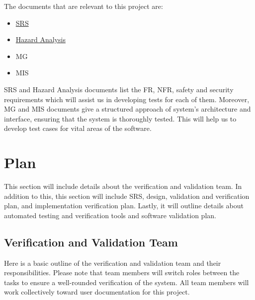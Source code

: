 \documentclass[12pt, titlepage]{article}
\begin{document}
The documents that are relevant to this project are:
\begin{itemize}
  \item \href{https://github.com/Inreet-Kaur/capstone/blob/main/docs/SRS/SRS.pdf}{SRS} \citep{SRS}
  \item \href{https://github.com/Inreet-Kaur/capstone/blob/main/docs/HazardAnalysis/HazardAnalysis.pdf}{Hazard Analysis} \citep{Hazard Analysis}
  \item MG
  \item MIS
\end{itemize}
SRS and Hazard Analysis documents list the FR, NFR, safety and security requirements which will assist us in developing tests for each of them. Moreover, MG and MIS documents give a structured approach of system's architecture and interface, ensuring that the system is thoroughly tested. This will help us to develop test cases for vital areas of the software.  


\section{Plan} \label{section:3}

This section will include details about the verification and validation team. In addition to this, this section will include SRS, design, validation and verification plan, and implementation verification plan. Lastly, it will outline details about automated testing and verification tools and software validation plan.

\subsection{Verification and Validation Team} \label{section:3.1}

Here is a basic outline of the verification and validation team and their responsibilities. Please note that team members will switch roles between the tasks to ensure a well-rounded verification of the system. All team members will work collectively toward user documentation for this project.
\end{document}
